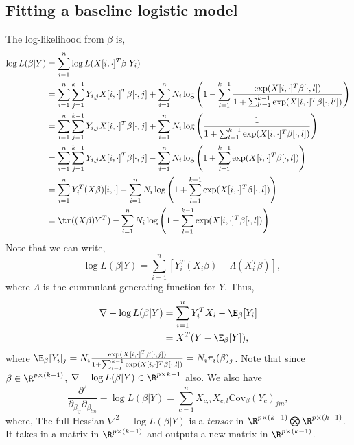 \subsection{Fitting a baseline logistic model}
The log-likelihood from $\beta$ is,
\begin{align*}
    \log L(\beta|Y)&= \sum_{i=1}^n\log L(X[i,\cdot]^T\beta|Y_i)\\
    &=\sum_{i=1}^n \sum_{j=1}^{k-1} Y_{i,j}X[i,\cdot]^T\beta[\cdot,j]+\sum_{i=1}^n N_i\log\left(1- \sum_{l=1}^{k-1}\frac{\exp(X[i,\cdot]^T \beta[\cdot,l])}{1+\sum_{l'=1}^{k-1}\exp(X[i,\cdot]^T \beta[\cdot,l'])}\right)\\
    &=\sum_{i=1}^n \sum_{j=1}^{k-1} Y_{i,j}X[i,\cdot]^T\beta[\cdot,j]+\sum_{i=1}^n N_i\log\left(\frac{1}{1+\sum_{l=1}^{k-1}\exp(X[i,\cdot]^T \beta[\cdot,l])}\right)\\
    &=\sum_{i=1}^n \sum_{j=1}^{k-1} Y_{i,j}X[i,\cdot]^T\beta[\cdot,j]-\sum_{i=1}^n N_i\log\left({1+\sum_{l=1}^{k-1}\exp(X[i,\cdot]^T \beta[\cdot,l])}\right)\\
    &=\sum_{i=1}^n Y_i^T(X\beta)[i,\cdot]-\sum_{i=1}^n N_i\log\left({1+\sum_{l=1}^{k-1}\exp(X[i,\cdot]^T \beta[\cdot,l])}\right)\\
    &=\tr((X\beta )Y^T)-\sum_{i=1}^n N_i\log\left({1+\sum_{l=1}^{k-1}\exp(X[i,\cdot]^T \beta[\cdot,l])}\right).
\end{align*}
Note that we can write,
\[-\log L(\beta|Y) = \sum_{i=1}^n \left[Y_i^T(X_i\beta) - \Lambda(X_i^T\beta)\right], \]
where $\Lambda$ is the cummulant generating function for $Y$. Thus,
\begin{align*}
    \nabla -\log L(\beta|Y) &= \sum_{i=1}^n Y_i^TX_i - \E_\beta[Y_i]\\
    &=X^T(Y-\E_\beta[Y]),
\end{align*}
where $\E_\beta[Y_i]_j = N_i\frac{\exp(X[i,\cdot]^T \beta[\cdot,j])}{1+\sum_{l=1}^{k-1}\exp(X[i,\cdot]^T \beta[\cdot,l])} = N_i\pi_i(\beta)_j$. Note that since $\beta \in \R^{p \times (k-1)}$, $\nabla - \log L(\beta|Y) \in \R^{p \times {k-1}}$ also. We also have
\[\frac{\partial^2}{\partial_{\beta_{ij}}\partial_{\beta_{lm}}}-\log L(\beta|Y) = \sum_{c=1}^n X_{c,i}X_{c,l}\text{Cov}_\beta(Y_c)_{jm}, \]
where,
The full Hessian $\nabla^2 - \log L(\beta|Y)$ is a \emph{tensor} in $\R^{p\times(k-1)} \bigotimes \R^{p \times (k-1)}$. It takes in a matrix in $\R^{p \times (k-1)}$ and outputs a new matrix in $\R^{p \times (k-1)}$.


